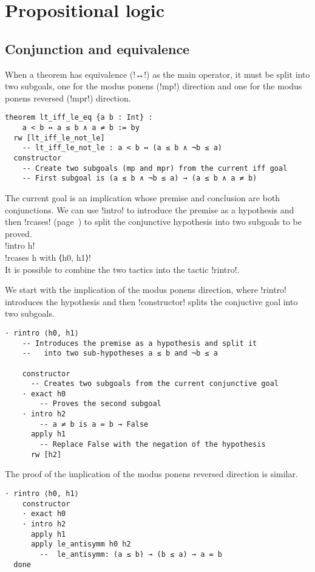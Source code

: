 
\section{Propositional logic}

\subsection{Conjunction and equivalence}

When a theorem has equivalence (!↔!) as the main operator, it must be split into two subgoals, one for the modus ponens (!mp!) direction and one for the modus ponens reversed (!mpr!) direction.

\begin{Verbatim}
theorem lt_iff_le_eq {a b : Int} : 
    a < b ↔ a ≤ b ∧ a ≠ b := by
  rw [lt_iff_le_not_le]
    -- lt_iff_le_not_le : a < b ↔ (a ≤ b ∧ ¬b ≤ a)
  constructor
    -- Create two subgoals (mp and mpr) from the current iff goal
    -- First subgoal is (a ≤ b ∧ ¬b ≤ a) → (a ≤ b ∧ a ≠ b)
 \end{Verbatim}

The current goal is an implication whose premise and conclusion are both conjunctions. We can use !intro! to introduce the premise as a hypothesis and then !rcases! (page~\pageref{p.rcases}) to split the conjunctive hypothesis into two subgoals to be proved.\\
\indnt{}!intro h!\\
\indnt{}!rcases h with ⟨h0, h1⟩!\\
It is possible to combine the two tactics into the tactic !rintro!.

We start with the implication of the modus ponens direction, where !rintro! introduces the hypothesis and then !constructor! splits the conjuctive goal into two subgoals.
\begin{Verbatim}[firstnumber=last]
  · rintro ⟨h0, h1⟩
    -- Introduces the premise as a hypothesis and split it
    --   into two sub-hypotheses a ≤ b and ¬b ≤ a

    constructor
      -- Creates two subgoals from the current conjunctive goal
    · exact h0
        -- Proves the second subgoal
    · intro h2
        -- a ≠ b is a = b → False
      apply h1
        -- Replace False with the negation of the hypothesis
      rw [h2]
\end{Verbatim}

The proof of the implication of the modus ponens reversed direction is similar.
\begin{Verbatim}[firstnumber=last]
  · rintro ⟨h0, h1⟩
    constructor
    · exact h0
    · intro h2
      apply h1
      apply le_antisymm h0 h2
        --  le_antisymm: (a ≤ b) → (b ≤ a) → a = b
  done
\end{Verbatim}

